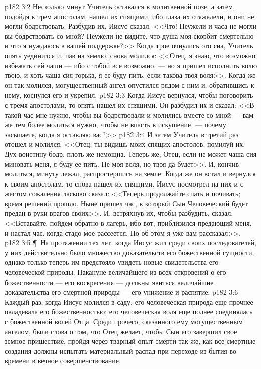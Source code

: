 \vs p182 3:2 Несколько минут Учитель оставался в молитвенной позе, а затем, подойдя к трем апостолам, нашел их спящими, ибо глаза их отяжелели, и они не могли бодрствовать. Разбудив их, Иисус сказал: <<Что! Неужели и часа не могли вы бодрствовать со мной? Неужели не видите, что душа моя скорбит смертельно и что я нуждаюсь в вашей поддержке?>> Когда трое очнулись ото сна, Учитель опять уединился и, пав на землю, снова молился: <<Отец, я знаю, что возможно избежать сей чаши --- ибо с тобой все возможно, --- но я пришел исполнить волю твою, и хоть чаша сия горька, я ее буду пить, если такова твоя воля>>. Когда же он так молился, могущественный ангел опустился рядом с ним и, обратившись к нему, коснулся его и укрепил.
\vs p182 3:3 Когда Иисус вернулся, чтобы поговорить с тремя апостолами, то опять нашел их спящими. Он разбудил их и сказал: <<В такой час мне нужно, чтобы вы бодрствовали и молились вместе со мной --- вам же тем более молиться нужно, чтобы не впасть в искушение, --- почему засыпаете, когда я оставляю вас?>>
\vs p182 3:4 И затем Учитель в третий раз отошел и молился: <<Отец, ты видишь моих спящих апостолов; помилуй их. Дух воистину бодр, плоть же немощна. Теперь же, Отец, если не может чаша сия миновать меня, я буду ее пить. Не моя воля, но твоя да будет>>. И, кончив молиться, минуту лежал, распростершись на земле. Когда же он встал и вернулся к своим апостолам, то снова нашел их спящими. Иисус посмотрел на них и с жестом сожаления ласково сказал: <<Теперь продолжайте спать и почивать; время решений прошло. Ныне пришел час, в который Сын Человеческий будет предан в руки врагов своих>>. И, встряхнув их, чтобы разбудить, сказал: <<Вставайте, пойдем обратно в лагерь, ибо вот, приблизился предающий меня, и настал час, когда стадо мое рассеется. Но об этом я уже вам рассказал>>.
\vs p182 3:5 \P\ На протяжении тех лет, когда Иисус жил среди своих последователей, у них действительно было множество доказательств его божественной сущности, однако только теперь им предстояло увидеть новые свидетельства его человеческой природы. Накануне величайшего из всех откровений о его божественности --- его воскресения --- должны явиться величайшие доказательства его смертной природы --- его унижение и распятие.
\vs p182 3:6 Каждый раз, когда Иисус молился в саду, его человеческая природа еще прочнее овладевала его божественностью; его человеческая воля еще полнее соединялась с божественной волей Отца. Среди прочего, сказанного ему могущественным ангелом, были слова о том, что Отец желает, чтобы Сын его завершил свое земное пришествие, пройдя через тварный опыт смерти так же, как все смертные создания должны испытать материальный распад при переходе из бытия во времени в вечное совершенствование.
